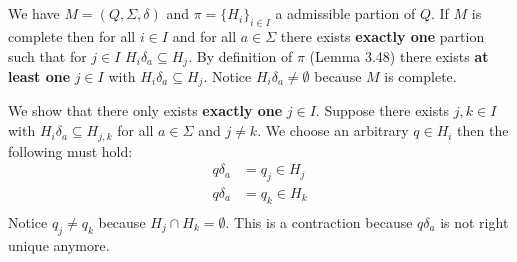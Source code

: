 \documentclass[a4paper,12pt,numbers=noenddot]{scrreport}
\begin{document}

\setcounter{chapter}{4}
\chapter{}
\section{}
We have $M = (Q, \Sigma, \delta)$ and $\pi = \{H_i\}_{i \in I}$ a admissible partion of $Q$.
If $M$ is complete then for all $i \in I$ and for all $a \in \Sigma$ there exists \textbf{exactly one} partion such that for $j \in I$ $H_i\delta_a \subseteq H_j$.
By definition of $\pi$ (Lemma 3.48) there exists \textbf{at least one} $j \in I$ with $H_i\delta_a \subseteq H_j$.
Notice $H_i\delta_a \neq \emptyset$ because $M$ is complete.

We show that there only exists \textbf{exactly one} $j \in I$.
Suppose there exists $j,k \in I$ with $H_i\delta_a \subseteq H_{j,k}$ for all $a \in \Sigma$ and $j \neq k$.
We choose an arbitrary $q \in H_i$ then the following must hold:
\begin{align*}
    q\delta_a &= q_j \in H_j \\
    q\delta_a &= q_k \in H_k \\
\end{align*}
Notice $q_j \neq q_k$ because $H_j \cap H_k = \emptyset$.
This is a contraction because $q\delta_a$ is not right unique anymore.

\section{}

\end{document}
